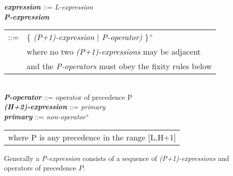 \documentclass[12pt]{article}
\newcommand{\PLUS}[1][]{{$^{+#1}$}}
\newcommand{\emkey}[1]{{\em \bfseries #1}}
\newenvironment{indpar}[1][0.3in]%
	{\begin{list}{}%
		     {\setlength{\itemsep}{0in}%
		      \setlength{\topsep}{0in}%
		      \setlength{\parsep}{1ex}%
		      \setlength{\labelwidth}{#1}%
		      \setlength{\leftmargin}{#1}%
		      \addtolength{\leftmargin}{\labelsep}}%
	 \item}%
	{\end{list}}
\begin{document}
\begin{indpar}\begin{minipage}{6in}
\emkey{expression}\label{EXPRESSION} ::= {\em L-expression}
\\[0.5ex]
\emkey{P-expression}
    \begin{tabular}[t]{@{}rl}
    ::= & \{ {\em (P+1)-expression} $|$ {\em P-operator)} \}\PLUS{} \\
        & where no two {\em (P+1)-expressions} may be adjacent \\ 
        & and the {\em P-operators} must obey the fixity rules below \\
    \end{tabular}
\\[0.5ex]
\emkey{P-operator} ::= operator of precedence P
\\[0.5ex]
\emkey{(H+2)-expression} ::= {\em primary}
\\[0.5ex]
\emkey{primary} ::= {\em non-operator}\PLUS{}
\\[2.0ex]
\hspace*{3em}\begin{tabular}{l}
where P is any precedence in the range [L,H+1]
\end{tabular}
\end{minipage}\end{indpar}

Generally
a {\em P-expression} consists of a sequence of {\em (P+1)-expressions}
and operators of precedence $P$.

\newpage
\end{document}

